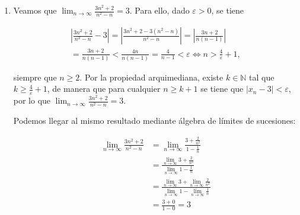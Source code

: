 \documentclass[
  spanish,
  a4paper,
]{scrreport}
\theoremstyle{definition}
\theoremstyle{remark}
\begin{document}
\begin{tcolorbox}
\begin{enumerate}
  \begin{align*}
  \lim_{n\to\infty}\frac{n^2-1}{3n^2+n-2} 
  &= \lim_{n\to\infty}\frac{1-\frac{1}{n^2}}{3+\frac{1}{n}-\frac{2}{n^2}} \\ 
  &= \frac{\lim_{n\to\infty}1-\frac{1}{n^2}}{\lim_{n\to\infty}3+\frac{1}{n}-\frac{2}{n^2}}\\ 
  &= \frac{\lim_{n\to\infty}1-\lim_{n\to\infty}\frac{1}{n^2}}{\lim_{n\to\infty}3+\lim_{n\to\infty}\frac{1}{n}-\lim_{n\to\infty}\frac{2}{n^2}}\\ 
  &= \frac{1-0}{3+0-0} = \frac{1}{3}.
  \end{align*}
\item
  Veamos que \(\lim_{n\to\infty}\frac{3n^2+2}{n^2-n}=3\). Para ello,
  dado \(\varepsilon>0\), se tiene

  \begin{gather}
  \left|\frac{3n^2+2}{n^2-n}-3\right| 
  = \left|\frac{3n^2+2-3(n^2-n)}{n^2-n}\right| 
  = \left|\frac{3n+2}{n(n-1)}\right| \\
  = \frac{3n+2}{n(n-1)} < \frac{4n}{n(n-1)} 
  = \frac{4}{n-1} < \varepsilon 
  \Leftrightarrow n > \frac{4}{\varepsilon}+1,
  \end{gather}

  siempre que \(n\geq 2\). Por la propiedad arquimediana, existe
  \(k\in \mathbb{N}\) tal que \(k\geq \frac{4}{\varepsilon}+1\), de
  manera que para cualquier \(n\geq k+1\) se tiene que
  \(\left|x_n-3\right|<\varepsilon\), por lo que
  \(\lim_{n\to\infty}\frac{3n^2+2}{n^2-n}=3\).

  Podemos llegar al mismo resultado mediante álgebra de límites de
  sucesiones:

  \begin{align*}
  \lim_{n\to\infty}\frac{3n^2+2}{n^2-n} 
  &= \lim_{n\to\infty}\frac{3+\frac{2}{n^2}}{1-\frac{1}{n}} \\ 
  &= \frac{\lim_{n\to\infty}3+\frac{2}{n^2}}{\lim_{n\to\infty}1-\frac{1}{n}}\\ 
  &= \frac{\lim_{n\to\infty}3+\lim_{n\to\infty}\frac{2}{n^2}}{\lim_{n\to\infty}1-\lim_{n\to\infty}\frac{1}{n}} \\ 
  &= \frac{3+0}{1-0} = 3
  \end{align*}
\end{enumerate}

\end{tcolorbox}
\end{document}

